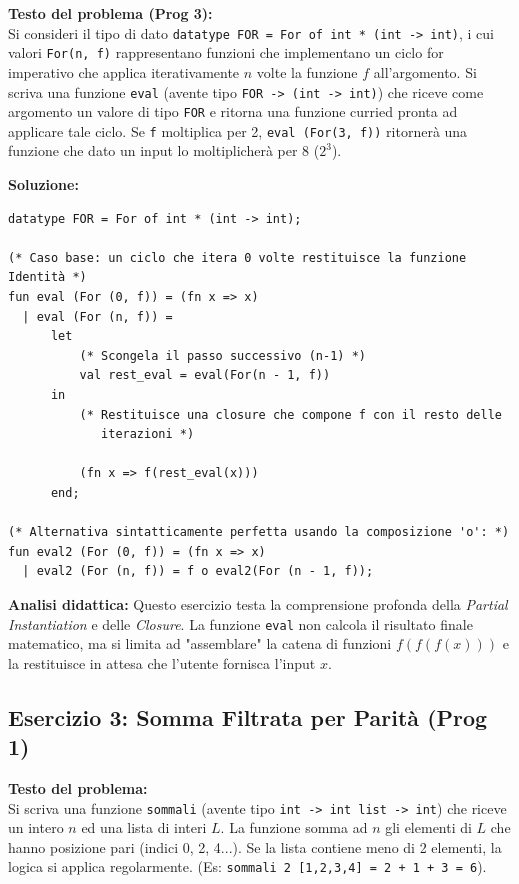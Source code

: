 \documentclass[12pt, a4paper]{article}
\begin{document}
\textbf{Testo del problema (Prog 3):}\\
Si consideri il tipo di dato \texttt{datatype FOR = For of int * (int -> int)}, i cui valori \texttt{For(n, f)} rappresentano funzioni che implementano un ciclo for imperativo che applica iterativamente $n$ volte la funzione $f$ all'argomento. Si scriva una funzione \texttt{eval} (avente tipo \texttt{FOR -> (int -> int)}) che riceve come argomento un valore di tipo \texttt{FOR} e ritorna una funzione curried pronta ad applicare tale ciclo.
Se \texttt{f} moltiplica per 2, \texttt{eval (For(3, f))} ritornerà una funzione che dato un input lo moltiplicherà per 8 ($2^3$).

\newpage

\textbf{Soluzione:}
\begin{verbatim}
datatype FOR = For of int * (int -> int);

(* Caso base: un ciclo che itera 0 volte restituisce la funzione Identità *)
fun eval (For (0, f)) = (fn x => x)
  | eval (For (n, f)) = 
      let 
          (* Scongela il passo successivo (n-1) *)
          val rest_eval = eval(For(n - 1, f))
      in 
          (* Restituisce una closure che compone f con il resto delle 
             iterazioni *)
             
          (fn x => f(rest_eval(x)))
      end;

(* Alternativa sintatticamente perfetta usando la composizione 'o': *)
fun eval2 (For (0, f)) = (fn x => x)
  | eval2 (For (n, f)) = f o eval2(For (n - 1, f));
\end{verbatim}
\textbf{Analisi didattica:} Questo esercizio testa la comprensione profonda della \textit{Partial Instantiation} e delle \textit{Closure}. La funzione \texttt{eval} non calcola il risultato finale matematico, ma si limita ad "assemblare" la catena di funzioni $f(f(f(x)))$ e la restituisce in attesa che l'utente fornisca l'input $x$.

\subsection{Esercizio 3: Somma Filtrata per Parità (Prog 1)}

\textbf{Testo del problema:}\\
Si scriva una funzione \texttt{sommali} (avente tipo \texttt{int -> int list -> int}) che riceve un intero $n$ ed una lista di interi $L$. La funzione somma ad $n$ gli elementi di $L$ che hanno posizione pari (indici 0, 2, 4...). Se la lista contiene meno di 2 elementi, la logica si applica regolarmente. (Es: \texttt{sommali 2 [1,2,3,4] = 2 + 1 + 3 = 6}).
\end{document}
